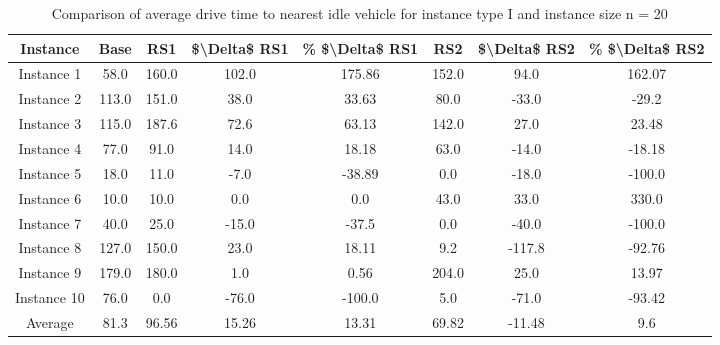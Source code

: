 \begin{table}[H]
\centering
\begin{tabular}{cccccccc}
  \hline
  \textbf{Instance} & \textbf{Base} & \textbf{RS1} & \textbf{\$\textbackslash{}Delta\$  RS1} & \textbf{\% \$\textbackslash{}Delta\$  RS1} & \textbf{RS2} & \textbf{\$\textbackslash{}Delta\$  RS2} & \textbf{\% \$\textbackslash{}Delta\$  RS2} \\\hline
  Instance 1 & 58.0 & 160.0 & 102.0 & 175.86 & 152.0 & 94.0 & 162.07 \\
  Instance 2 & 113.0 & 151.0 & 38.0 & 33.63 & 80.0 & -33.0 & -29.2 \\
  Instance 3 & 115.0 & 187.6 & 72.6 & 63.13 & 142.0 & 27.0 & 23.48 \\
  Instance 4 & 77.0 & 91.0 & 14.0 & 18.18 & 63.0 & -14.0 & -18.18 \\
  Instance 5 & 18.0 & 11.0 & -7.0 & -38.89 & 0.0 & -18.0 & -100.0 \\
  Instance 6 & 10.0 & 10.0 & 0.0 & 0.0 & 43.0 & 33.0 & 330.0 \\
  Instance 7 & 40.0 & 25.0 & -15.0 & -37.5 & 0.0 & -40.0 & -100.0 \\
  Instance 8 & 127.0 & 150.0 & 23.0 & 18.11 & 9.2 & -117.8 & -92.76 \\
  Instance 9 & 179.0 & 180.0 & 1.0 & 0.56 & 204.0 & 25.0 & 13.97 \\
  Instance 10 & 76.0 & 0.0 & -76.0 & -100.0 & 5.0 & -71.0 & -93.42 \\
  Average & 81.3 & 96.56 & 15.26 & 13.31 & 69.82 & -11.48 & 9.6 \\\hline
\end{tabular}
\caption{Comparison of average drive time to nearest idle vehicle for instance type I and instance size n = 20}
\label{tab:wait:resrelocation-nearest-drive-time-comparison_I_20}
\end{table}
